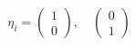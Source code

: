 \begin{equation}
 \eta_i
 = \left( \begin{array}{c} 1 \\ 0 \end{array} \right), \quad
   \left( \begin{array}{c} 0 \\ 1 \end{array} \right)
\end{equation}

